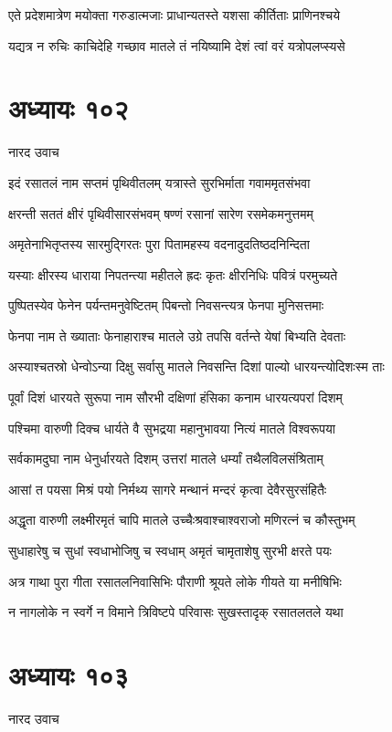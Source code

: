 \twolineshloka
{एते प्रदेशमात्रेण मयोक्ता गरुडात्मजाः}
{प्राधान्यतस्ते यशसा कीर्तिताः प्राणिनश्चये}


\twolineshloka
{यद्यत्र न रुचिः काचिदेहि गच्छाव मातले}
{तं नयिष्यामि देशं त्वां वरं यत्रोपलप्स्यसे}


\chapter{अध्यायः १०२}
\twolineshloka
{नारद उवाच}
{}


\twolineshloka
{इदं रसातलं नाम सप्तमं पृथिवीतलम्}
{यत्रास्ते सुरभिर्माता गवाममृतसंभवा}


\twolineshloka
{क्षरन्ती सततं क्षीरं पृथिवीसारसंभवम्}
{षण्णं रसानां सारेण रसमेकमनुत्तमम्}


\twolineshloka
{अमृतेनाभितृप्तस्य सारमुद्गिरतः पुरा}
{पितामहस्य वदनादुदतिष्ठदनिन्दिता}


\twolineshloka
{यस्याः क्षीरस्य धाराया निपतन्त्या महीतले}
{ह्रदः कृतः क्षीरनिधिः पवित्रं परमुच्यते}


\twolineshloka
{पुष्पितस्येव फेनेन पर्यन्तमनुवेष्टितम्}
{पिबन्तो निवसन्त्यत्र फेनपा मुनिसत्तमाः}


\twolineshloka
{फेनपा नाम ते ख्याताः फेनाहाराश्च मातले}
{उग्रे तपसि वर्तन्ते येषां बिभ्यति देवताः}


\twolineshloka
{अस्याश्चतस्रो धेन्वोऽन्या दिक्षु सर्वासु मातले}
{निवसन्ति दिशां पाल्यो धारयन्त्योदिशःस्म ताः}


\twolineshloka
{पूर्वां दिशं धारयते सुरूपा नाम सौरभी}
{दक्षिणां हंसिका कनाम धारयत्यपरां दिशम्}


\twolineshloka
{पश्चिमा वारुणी दिक्च धार्यते वै सुभद्रया}
{महानुभावया नित्यं मातले विश्वरूपया}


\twolineshloka
{सर्वकामदुघा नाम धेनुर्धारयते दिशम्}
{उत्तरां मातले धर्म्यां तथैलविलसंश्रिताम्}


\twolineshloka
{आसां त पयसा मिश्रं पयो निर्मथ्य सागरे}
{मन्थानं मन्दरं कृत्वा देवैरसुरसंहितैः}


\twolineshloka
{अद्धृता वारुणी लक्ष्मीरमृतं चापि मातले}
{उच्चैःश्रवाश्चाश्वराजो मणिरत्नं च कौस्तुभम्}


\twolineshloka
{सुधाहारेषु च सुधां स्वधाभोजिषु च स्वधाम्}
{अमृतं चामृताशेषु सुरभी क्षरते पयः}


\twolineshloka
{अत्र गाथा पुरा गीता रसातलनिवासिभिः}
{पौराणी श्रूयते लोके गीयते या मनीषिभिः}


\twolineshloka
{न नागलोके न स्वर्गे न विमाने त्रिविष्टपे}
{परिवासः सुखस्तादृक् रसातलतले यथा}


\chapter{अध्यायः १०३}
\twolineshloka
{नारद उवाच}
{}


